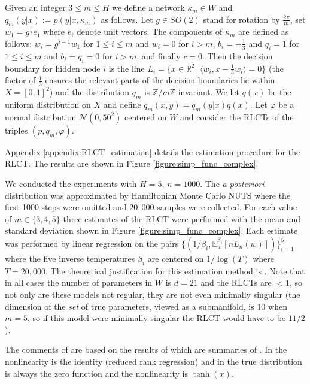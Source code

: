 \documentclass{article} %
\def\l{\,|\,}
\begin{document}
Given an integer $3 \le m \le H$ we define a network $\kappa_m \in W$ and $q_m(y|x) := p(y|x, \kappa_m)$ as follows. Let $g \in SO(2)$ stand for rotation by $\frac{2\pi}{m}$, set $w_1 = g^{\tfrac{1}{2}} e_1$ where $e_i$ denote unit vectors. The components of $\kappa_m$ are defined as follows: $w_i = g^{i-1} w_1$ for $1 \le i \le m$ and $w_i = 0$ for $i > m$, $b_i = - \tfrac{1}{3}$ and $q_i = 1$ for $1 \le i \le m$ and $b_i = q_i = 0$ for $i > m$, and finally $c = 0$. Then the decision boundary for hidden node $i$ is the line $L_i = \{ x \in \mathbb{R}^2 \l \langle w_i, x - \tfrac{1}{3} w_i \rangle = 0 \}$ (the factor of $\tfrac{1}{3}$ ensures the relevant parts of the decision boundaries lie within $X = [0,1]^2$) and the distribution $q_m$ is $\mathbb{Z}/m\mathbb{Z}$-invariant. We let $q(x)$ be the uniform distribution on $X$ and define $q_m(x,y) = q_m(y|x) q(x)$. Let $\varphi$ be a normal distribution $\mathcal{N}(0,50^2)$ centered on $W$ and consider the RLCTs of the triples $(p, q_m, \varphi)$. 

Appendix \ref{appendix:RLCT_estimation} details the estimation procedure for the RLCT. The results are shown in Figure \ref{figure:simp_func_complex}.

We conducted the experiments with $H = 5$, $n = 1000$. The \emph{a posteriori} distribution was approximated by Hamiltonian Monte Carlo NUTS \cite{?} where the first 1000 steps were omitted and $20,000$ samples were collected. For each value of $m \in \{3,4,5\}$ three estimates of the RLCT were performed with the mean and standard deviation shown in Figure \ref{figure:simp_func_complex}. Each estimate was performed by linear regression on the pairs $\{ (1/\beta_i, \mathbb{E}^{\beta_i}_w[ nL_n(w) ] ) \}_{i=1}^5$ where the five inverse temperatures $\beta_i$ are centered on $1/\log(T)$ where $T = 20,000$. The theoretical justification for this estimation method is \citep[Theorem 4]{watanabe_widely_2013}. Note that in all cases the number of parameters in $W$ is $d = 21$ and the RLCTs are $< 1$, so not only are these models not regular, they are not even minimally singular (the dimension of the \emph{set} of true parameters, viewed as a submanifold, is $10$ when $m = 5$, so if this model were minimally singular the RLCT would have to be $11/2$).

The comments of \citep[\S 7.6]{watanabe_algebraic_2009} are based on the results of \citep[\S 7.2]{watanabe_algebraic_2009} which are summaries of \cite{??,??}. In \cite{??} the nonlinearity is the identity (reduced rank regression) and in \cite{??} the true distribution is always the zero function and the nonlinearity is $\operatorname{tanh}(x)$.
\end{document}
